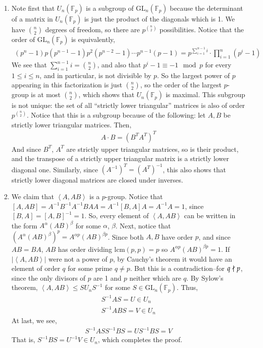 \documentclass[12pt]{article}
\theoremstyle{definitionstyle}
\def\mbb#1{\mathbb{#1}}
\newcommand{\gen}[1]{\left\langle #1 \right\rangle}
\newcommand{\F}{\mbb F}
\begin{document}
\begin{enumerate}[leftmargin=\labelsep]
\begin{enumerate}
			\item Note first that $U_n(\F_p)$ is a subgroup of $\mathrm{GL}_n(\F_p)$ because the determinant of a matrix in $U_n(\F_p)$ is just the product of the diagonals which is 1. We have ${n \choose 2}$ degrees of freedom, so there are $p^{{n\choose 2}}$ possibilities. Notice that the order of $\mathrm{GL}_n(\F_p)$ is equivalently,
			\begin{align*}
				(p^n-1) p (p^{n-1}-1) p^2(p^{n-2}-1) \cdots p^{n-1}(p-1) = p^{\sum_{i=1}^{n-1} i} \cdot \prod_{i=1}^n (p^i-1)
			\end{align*}
			We see that $\sum_{i=1}^{n-1} i = {n \choose 2}$, and also that $p^i - 1 \equiv -1 \mod p$ for every $1 \leq i \leq n$, and in particular, is not divisible by $p$. So the largest power of $p$ appearing in this factorization is just ${n \choose 2}$, so the order of the largest $p$-group is at most ${n \choose 2}$, which shows that $U_n(\F_p)$ is maximal. This subgroup is not unique: the set of all ``strictly lower triangular'' matrices is also of order $p^{{n \choose 2}}$. Notice that this is a subgroup because of the following: let $A, B$ be strictly lower triangular matrices. Then,
			\begin{align*}
				A \cdot B = (B^TA^T)^T
			\end{align*}
			And since $B^T$, $A^T$ are strictly upper triangular matrices, so is their product, and the transpose of a strictly upper triangular matrix is a strictly lower diagonal one. Similarly, since $(A^{-1})^T = (A^T)^{-1}$, this also shows that strictly lower diagonal matrices are closed under inverses.
			
			\item We claim that $\gen{A, AB}$ is a $p$-group. Notice that $[A, AB] = A^{-1}B^{-1}A^{-1}BAA = A^{-1}[B, A]A = A^{-1}A = 1$, since $[B, A] = [A, B]^{-1} = 1$. So, every element of $\gen{A, AB}$ can be written in the form $A^\alpha (AB)^{\beta}$ for some $\alpha$, $\beta$. Next, notice that $(A^{\alpha} (AB)^{\beta})^p = A^{\alpha p} (AB)^{\beta p}$. Since both $A,B$ have order $p$, and since $AB = BA$, $AB$ has order dividing $\mathrm{lcm}(p, p) = p$ so $A^{\alpha p} (AB)^{\beta p} = 1$. If $|\gen{A, AB}|$ were not a power of $p$, by Cauchy's theorem it would have an element of order $q$ for some prime $q \neq p$. But this is a contradiction--for $q \not \mid p$, since the only divisors of $p$ are 1 and $p$ neither which are $q$. By Sylow's theorem, $\gen{A, AB} \leq SU_nS^{-1}$ for some $S \in \mathrm{GL}_n(\F_p)$. Thus,
			\begin{align*}
				S^{-1}AS = U \in U_n \\
				S^{-1}ABS = V \in U_n
			\end{align*}
			At last, we see,
			\begin{align*}
				S^{-1}ASS^{-1}BS = US^{-1}BS = V
			\end{align*}
			That is, $S^{-1}BS = U^{-1}V \in U_n$, which completes the proof.
			

\end{enumerate}
\end{enumerate}
\end{document}

